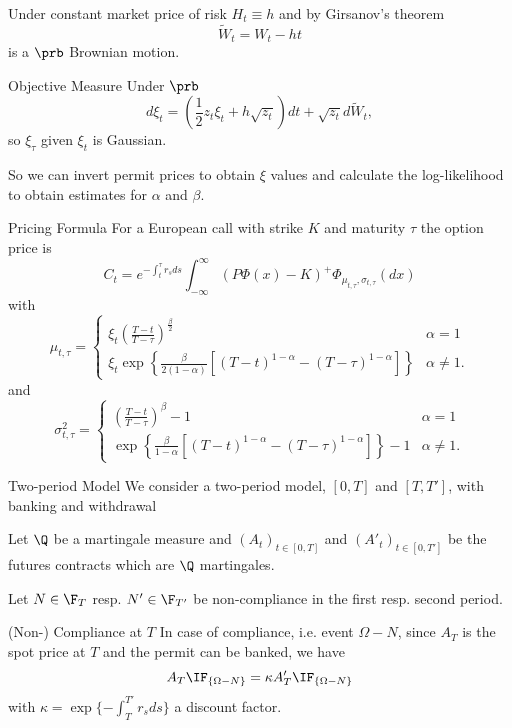 	Under constant market price of risk $H_t \equiv h$ and by Girsanov's theorem
		$$
		\tilde{W}_t = W_t - ht
		$$
	is a $\prb$ Brownian motion.


Objective Measure
	Under $\prb$
		$$
		d\xi_t = \left(\frac{1}{2} z_t \xi_t + h \sqrt{z_t} \right)dt + \sqrt{z_t} d\tilde{W}_t,
		$$
	so $\xi_{\tau}$ given $\xi_t$ is Gaussian.
	
	So we can invert permit prices to obtain $\xi$ values and calculate the log-likelihood to obtain
	estimates for $\alpha$ and $\beta$.
	

Pricing Formula
	For a European call with strike $K$ and maturity $\tau$ the option price is
		$$
		C_t = e^{-\int_t^\tau r_s ds} \int_{-\infty}^\infty (P\Phi(x)-K)^+ \Phi_{\mu_{t,\tau}, \sigma_{t,\tau}}(dx)
		$$
	with
		$$
		\mu_{t,\tau}=
		\left\{
		\begin{array}{ll}
		\xi_t \left(\frac{T-t}{T-\tau}\right)^{\frac{\beta}{2}} & \alpha =1\\
		\xi_t \exp\left\{\frac{\beta}{2(1-\alpha)}[(T-t)^{1-\alpha}-(T-\tau)^{1-\alpha}]\right\} & \alpha \not= 1.
		\end{array}
		\right.
		$$
	and
		$$
		\sigma^2_{t,\tau}=
		\left\{
		\begin{array}{ll}
		\left(\frac{T-t}{T-\tau}\right)^\beta-1 & \alpha =1\\
		\exp\left\{\frac{\beta}{1-\alpha}[(T-t)^{1-\alpha}-(T-\tau)^{1-\alpha}]\right\}-1 & \alpha \not= 1.
		\end{array}
		\right.
		$$


Two-period Model
	We consider a two-period model, $[0,T]$ and $[T,T']$, with banking and withdrawal
	
	Let $\Q$ be a martingale measure and $(A_t)_{t\in[0,T]}$ and $(A'_t)_{t\in[0,T']}$
	be the futures contracts which are $\Q$ martingales.
	
	Let $N\in \F_T$ resp. $N' \in \F_{T'}$ be non-compliance in the first resp. second period.


(Non-) Compliance at $T$
	In case of compliance, i.e. event $\Omega-N$, since $A_T$ is the spot price at $T$ and the permit can be banked,  we have
		$$
		A_T\IF_{\{\Omega-N\}}= \kappa A'_T \IF_{\{\Omega-N\}}
		$$
	with $\kappa= \exp\{-\int_T^{T'}r_s ds\}$ a discount factor.
	
